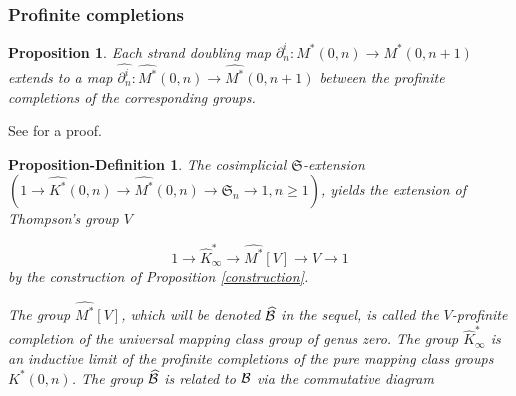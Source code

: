 \documentclass[twoside]{irmaems}
\theoremstyle{plain}
\newtheorem{proposition}[theorem]{Proposition}
\newtheorem{proposition-definition}[theorem]{Proposition-Definition}
\theoremstyle{definition}
\theoremstyle{remark}
\newcommand{\B}{{{\cal B}}}
\begin{document}
\subsubsection*{Profinite completions}



\begin{proposition}
Each strand doubling map  $\partial^{i}_{n}: M^*(0,n)\rightarrow M^*(0,n+1)$ 
extends to a map
$\widehat{\partial^{i}_{n}}: \widehat{M^*}(0,n)\rightarrow \widehat{M^*}(0,n+1)$ between the profinite completions of the corresponding groups.
 \end{proposition}

\vspace{0.1cm}\noindent 
See \cite{ka2} for a proof.


\begin{proposition-definition}

The  cosimplicial $\mathfrak{S}$-extension $(1\rightarrow
  \widehat{K^*}(0,n)\longrightarrow \widehat{M^*}(0,n) \longrightarrow \mathfrak{S}_n\rightarrow
  1, n\geq 1)$, yields the extension of Thompson's group $V$


$$1\rightarrow \widehat{K}^*_{\infty}\longrightarrow \widehat{M^*}[V]\longrightarrow V\rightarrow 1$$
by the construction of Proposition \ref{construction}.

\vspace{0.1cm}\noindent 
The group $\widehat{M^*}[V]$, which will be  denoted $\widehat{\B}$ in the sequel,  is called the $V$-profinite
completion of the universal mapping class group of genus zero. The group 
$\widehat{K}^*_{\infty}$ is an inductive limit of the profinite completions of the pure mapping class groups 
$K^*(0,n)$. The group $\widehat{\cal B}$ is related to ${\cal B}$ via the commutative
diagram


\end{proposition-definition}
\end{document}
